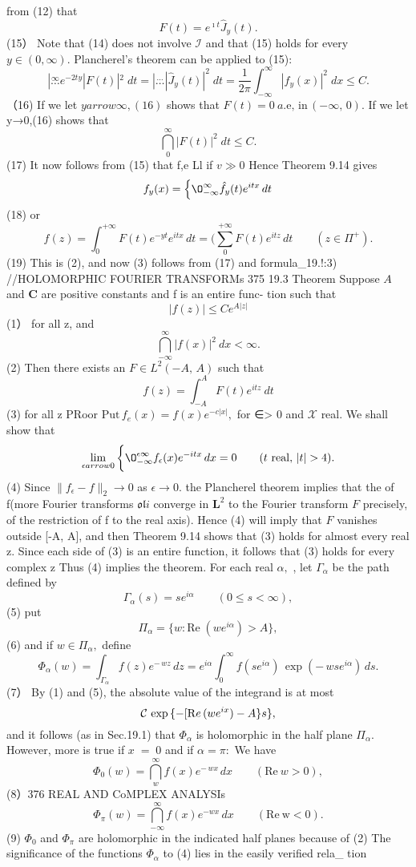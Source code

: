 from (12) that $$ F(t)=e^{\imath t}{\hat{J}}_{y}(t). $$ (15） Note that (14) does not involve $\scriptstyle{\mathcal{I}}$ and that (15) holds for every $y\in(0,\infty).$ Plancherel's theorem can be applied to (15): $$ |\stackrel{\infty}{\ldots}e^{-2t y}|F(t)|^{2}\;d t= |\stackrel{\cdots}{\ldots}|\hat{J}_{y}(t)|^{2}\;d t=\frac{1}{2\pi}\int_{-\infty}^{\infty}|f_{y}(x)|^{2}\;d x\leq C. $$ （16) If we let $y arrow\infty,(16)$ shows that $F(t)=0\ a.\mathrm{e},\,\mathrm{in}\,(-\infty,\,0).$ If we let y→0,(16) shows that $$ \bigcap_{0}^{\infty}|F(t)|^{2}\;d t\leq C. $$ (17) It now follows from (15) that f,e Ll if $\scriptstyle v\gg0$ Hence Theorem 9.14 gives $$ f_{y}(x)=\left\{\O_{-\infty}^{\infty}{\hat{f}}_{y}(t)e^{i t x}\,d t\right. $$ (18) or $$ f(z)=\int_{0}^{+\infty}F(t)e^{-y t}e^{i t x}\,d t= (\sum_{0}^{+\infty}F(t)e^{i t z}\,d t\qquad(z\in\Pi^{+}). $$ (19) This is (2), and now (3) follows from (17) and formula_19.!:3) //HOLOMORPHIC FOURIER TRANSFORMs 375 19.3 Theorem Suppose $\scriptstyle A$ and ${\boldsymbol{C}}$ are positive constants and f is an entire func- tion such that $$ |f(z)|\leq C e^{A|z|} $$ (1） for all z, and $$ \bigcap_{-\infty}^{\infty}|f(x)|^{2}\ d x<\infty. $$ (2) Then there exists an $F\in L^{2}(-A,\,A)$ such that $$ f(z)=\int_{-A}^{A}F(t)e^{i t z}~d t $$ (3) for all z PRoor ${\mathrm{Put}}\,f_{e}(x)=f(x)e^{-c|x|},$ for ∈> 0 and $\scriptstyle{\mathcal{X}}$ real. We shall show that $$ \operatorname*{lim}_{\epsilon arrow0}\bigg\{\O_{-\infty}^{\epsilon\infty}f_{\epsilon}(x)e^{-i t x}\,d x=0\qquad(t\mathrm{~real},\,|t|>4). $$ (4) Since $\|f_{\epsilon}-f\|_{2}\to0$ as $\scriptstyle\epsilon\to0.$ the Plancherel theorem implies that the of f(more Fourier transforms ${\mathfrak{o l}}i$ converge in ${\boldsymbol{L}}^{2}$ to the Fourier transform ${\mathbf{}}F$ precisely, of the restriction of f to the real axis). Hence (4) will imply that ${\mathbf{}}F$ vanishes outside [-A, A], and then Theorem 9.14 shows that (3) holds for almost every real z. Since each side of (3) is an entire function, it follows that (3) holds for every complex z Thus (4) implies the theorem. For each real $\alpha,$ , let $\Gamma_{\alpha}$ be the path defined by $$ \Gamma_{\alpha}(s)=s e^{i\alpha}\qquad(0\le s<\infty), $$ (5) put $$ \Pi_{\alpha}=\{w\colon\mathrm{Re}\;(w e^{i\alpha})>A\}, $$ (6) and if $w\in\Pi_{\alpha},$ define $$ \Phi_{\alpha}(w)=\int_{\Gamma_{\alpha}}f(z)e^{-\,w z}\,d z=e^{i\alpha}\int_{0}^{\infty}f(s e^{i\alpha})\,\exp\left(-\,w s e^{i\alpha}\right)\,d s. $$ (7） By (1) and (5), the absolute value of the integrand is at most $$ {\cal C}\,\exp\,\{-[{\mathrm R e}\,(w e^{i x})-A\}s\}, $$ and it follows (as in Sec.19.1) that $\Phi_{\alpha}$ is holomorphic in the half plane $\Pi_{\alpha}.$ However, more is true if $\scriptstyle x\;=\;0$ and if $\alpha=\pi\colon$ We have $$ \Phi_{0}(w)=\bigcap_{w}^{\infty}f(x)e^{-\,w x\,}d x\qquad(\mathrm{Re}\ w>0), $$ (8）376 REAL AND CoMPLEX ANALYSIs $$ \Phi_{\pi}(w)=\bigcap_{-\infty}^{\infty}f(x)e^{-w x}\,d x\qquad(\mathrm{Re~w<0}). $$ (9) $\Phi_{0}$ and $\Phi_{\pi}$ are holomorphic in the indicated half planes because of (2) The significance of the functions $\Phi_{\alpha}$ to (4) lies in the easily verified rela_ tion $$ 